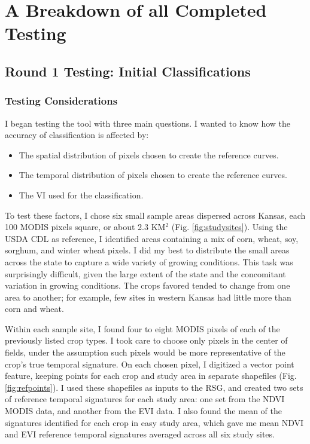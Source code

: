 \chapter{A Breakdown of all Completed Testing}
\label{appendix:testing}

\section{Round 1 Testing: Initial Classifications}
\subsection*{Testing Considerations}

I began testing the tool with three main questions. I wanted to know how the accuracy of classification is affected by:

\begin{Spacing}{1.2}
\begin{itemize}
  \item The spatial distribution of pixels chosen to create the reference curves.
  \item The temporal distribution of pixels chosen to create the reference curves.
  \item The VI used for the classification.
\end{itemize}
\end{Spacing}

To test these factors, I chose six small sample areas dispersed across Kansas, each 100 MODIS pixels square, or about 2.3 KM$^2$ (Fig. \ref{fig:studysites}). Using the USDA CDL as reference, I identified areas containing a mix of corn, wheat, soy, sorghum, and winter wheat pixels. I did my best to distribute the small areas across the state to capture a wide variety of growing conditions. This task was surprisingly difficult, given the large extent of the state and the concomitant variation in growing conditions. The crops favored tended to change from one area to another; for example, few sites in western Kansas had little more than corn and wheat.

Within each sample site, I found four to eight MODIS pixels of each of the previously listed crop types. I took care to choose only pixels in the center of fields, under the assumption such pixels would be more representative of the crop’s true temporal signature. On each chosen pixel, I digitized a vector point feature, keeping points for each crop and study area in separate shapefiles  (Fig. \ref{fig:refpoints}). I used these shapefiles as inputs to the RSG, and created two sets of reference temporal signatures for each study area: one set from the NDVI MODIS data, and another from the EVI data. I also found the mean of the signatures identified for each crop in easy study area, which gave me mean NDVI and EVI reference temporal signatures averaged across all six study sites.

